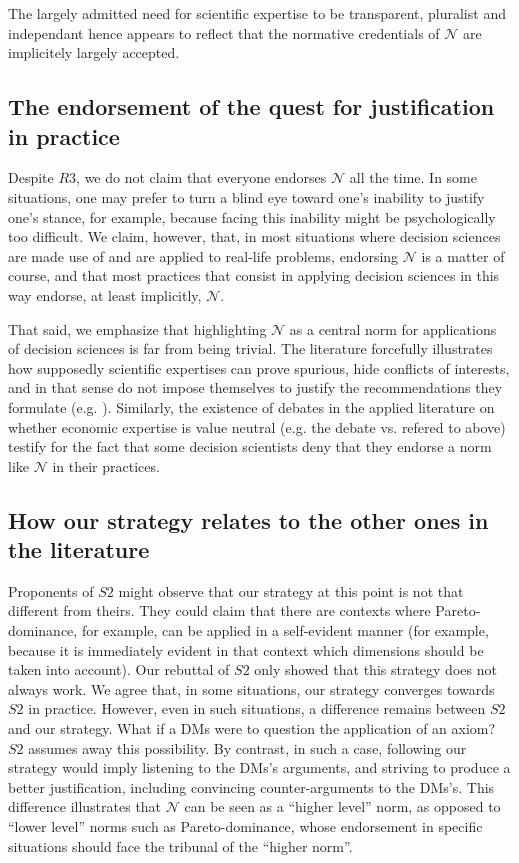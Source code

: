 \documentclass[preprint, french, english, 11pt, authoryear]{elsarticle}%
\newcommand{\adv}{\mathscr{N}}
\begin{document}
The largely admitted need for scientific expertise to be transparent, pluralist and independant hence appears to reflect that the normative credentials of $\adv$ are implicitely largely accepted. 

\subsection{The endorsement of the quest for justification in practice}
Despite $R3$, we do not claim that everyone endorses $\adv$ all the time. In some situations, one may prefer to turn a blind eye toward one's inability to justify one's stance, for example, because facing this inability might be psychologically too difficult. We claim, however, that, in most situations where decision sciences are made use of and are applied to real-life problems, endorsing $\adv$ is a matter of course, and that most practices that consist in applying decision sciences in this way endorse, at least implicitly, $\adv$.

That said, we emphasize that highlighting $\adv$ as a central norm for applications of decision sciences is far from being trivial. The literature forcefully illustrates how supposedly scientific expertises can prove spurious, hide conflicts of interests, and in that sense do not impose themselves to justify the recommendations they formulate (e.g. \citet{hoggan_climate_2009,oreskes_merchants_2011}). Similarly, the existence of debates in the applied literature on whether economic expertise is value neutral (e.g. the debate \citet{spash_bulldozing_2015} vs. \citet{scharks_dont_2016} refered to above) testify for the fact that some decision scientists deny that they endorse a norm like $\adv$ in their practices.

\subsection{How our strategy relates to the other ones in the literature}

Proponents of $S2$ might observe that our strategy at this point is not that different from theirs. They could claim that there are contexts where Pareto-dominance, for example, can be applied in a self-evident manner (for example, because it is immediately evident in that context which dimensions should be taken into account). Our rebuttal of $S2$ only showed that this strategy does not always work. We agree that, in some situations, our strategy converges towards $S2$ in practice. However, even in such situations, a difference remains between $S2$ and our strategy. What if a \acp{DM} were to question the application of an axiom? $S2$ assumes away this possibility. By contrast, in such a case, following our strategy would imply listening to the \acp{DM}'s arguments, and striving to produce a better justification, including convincing counter-arguments to the \acp{DM}'s. This difference illustrates that $\adv$ can be seen as a ``higher level'' norm, as opposed to ``lower level'' norms such as Pareto-dominance, whose endorsement in specific situations should face the tribunal of the ``higher norm''.
\end{document}
